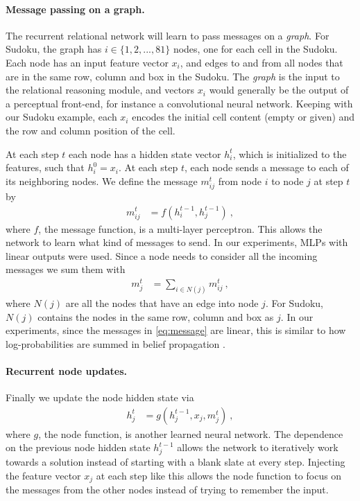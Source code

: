 \documentclass{article}
\begin{document}
\paragraph{Message passing on a graph.}
The recurrent relational network will learn to pass messages on a \emph{graph}.
For Sudoku,
the graph has $i \in \{1,2,...,81\}$ nodes, one for each cell in the Sudoku.
Each node has an input feature vector $x_i$,
and edges to and from all nodes that are in the same row, column and box in the Sudoku.
The \emph{graph} is the input to the relational reasoning module,
and vectors $x_i$ would generally be the output of a perceptual front-end, for instance a convolutional neural network.
Keeping with our Sudoku example, each $x_i$ encodes the initial cell content (empty or given) and the row and column position of the cell.

At each step $t$ each node has a hidden state vector $h_i^t$,
which is initialized to the features, such that $h_i^0 = x_i$.
At each step $t$, each node sends a message to each of its neighboring nodes.
We define the message $m_{ij}^t$ from node $i$ to node $j$ at step $t$ by
%
\begin{align}
\label{eq:message}
    m_{ij}^t &= f\left(h_i^{t-1}, h_j^{t-1}\right) \ ,
\end{align}
%
where $f$, the message function, is a multi-layer perceptron.
This allows the network to learn what kind of messages to send.
In our experiments, MLPs with linear outputs were used.
Since a node needs to consider all the incoming messages we sum them with
\begin{align}
\label{eq:sum}
    m_j^t &= \sum_{i \in N(j)} m_{ij}^t \ ,
\end{align}
%
where $N(j)$ are all the nodes that have an edge into node $j$.
For Sudoku, $N(j)$ contains the nodes in the same row, column and box as $j$.
In our experiments, since the messages in \eqref{eq:message} are linear, this is similar to how log-probabilities are summed in belief propagation \citep{murphy1999loopy}.

\paragraph{Recurrent node updates.}
Finally we update the node hidden state via
%
\begin{align}
\label{eq:recurrence}
    h_j^t &= g\left(h_j^{t-1}, x_j, m_j^t\right) \ ,
\end{align}
%
where $g$, the node function, is another learned neural network.
The dependence on the previous node hidden state $h_j^{t-1}$ allows the network to iteratively work towards a solution instead of starting with a blank slate at every step.
Injecting the feature vector $x_j$ at each step like this allows the node function to focus on the messages from the other nodes instead of trying to remember the input.
\end{document}

